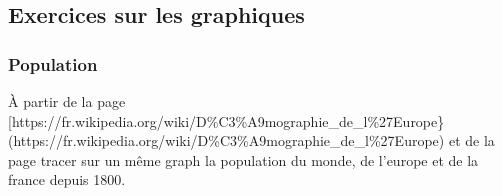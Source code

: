 \documentclass[letterpaper,10pt,english]{sphinxhowto}
\begin{document}
\subsection{Exercices sur les graphiques}
\label{\detokenize{cours7_graphiques_exercices:exercices-sur-les-graphiques}}\label{\detokenize{cours7_graphiques_exercices::doc}}

\subsubsection{Population}
\label{\detokenize{cours7_graphiques_exercices:population}}
\sphinxAtStartPar
À partir de la page {[}https://fr.wikipedia.org/wiki/D\%C3\%A9mographie\_de\_l\%27Europe\}(https://fr.wikipedia.org/wiki/D\%C3\%A9mographie\_de\_l\%27Europe) et de la page  tracer sur un même graph la population du monde, de l’europe et de la france depuis 1800.
\end{document}
